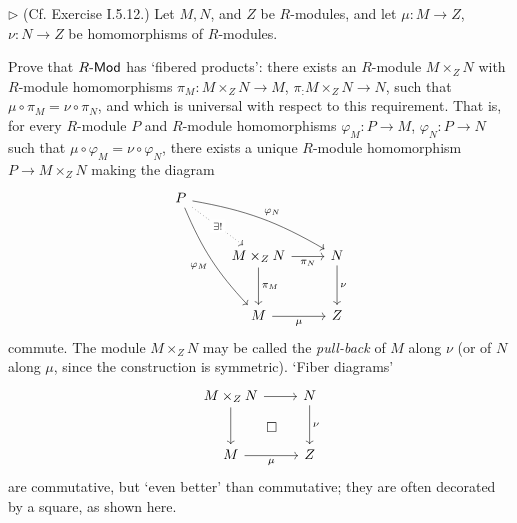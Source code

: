 \begin{problem}
	$\triangleright$ (Cf. Exercise I.5.12.) Let $M, N$, and $Z$ be $R$-modules, and let $\mu: M \to Z$, $\nu: N \to Z$ be homomorphisms of $R$-modules.
	
	Prove that $R\text{-}\mathsf{Mod}$ has `fibered products': there exists an $R$-module $M \times_Z N$ with $R$-module homomorphisms $\pi_M: M \times_Z N \to M$, $\pi_: M \times_Z N \to N$, such that $\mu \circ \pi_M = \nu \circ \pi_N$, and which is universal with respect to this requirement. That is, for every $R$-module $P$ and $R$-module homomorphisms $\varphi_M: P \to M$, $\varphi_N: P \to N$ such that $\mu \circ \varphi_M = \nu \circ \varphi_N$, there exists a unique $R$-module homomorphism $P \to M \times_Z N$ making the diagram
	\begin{equation*}
		\begin{tikzcd}[row sep=large]
			P
			\arrow[drr, bend left=10, "\varphi_N"]
			\arrow[dr, dotted, "\exists!" description]
			\arrow[ddr, bend right=10, "\varphi_M"']
			& & \\
			& M \times_Z N
			\arrow[r, "\pi_N"']
			\arrow[d, "\pi_M"]
			& N
			\arrow[d, "\nu"] \\
			& M
			\arrow[r, "\mu"']
			& Z
		\end{tikzcd}
	\end{equation*}
	commute. The module $M \times_Z N$ may be called the \emph{pull-back} of $M$ along $\nu$ (or of $N$ along $\mu$, since the construction is symmetric). `Fiber diagrams'
	\begin{equation*}
		\begin{tikzcd}[row sep=large]
			M \times_Z N
			\arrow[r]
			\arrow[d]
			\arrow[dr, phantom, "\square"]
			& N
			\arrow[d, "\nu"] \\
			M
			\arrow[r, "\mu"']
			& Z
		\end{tikzcd}
	\end{equation*}
	are commutative, but `even better' than commutative; they are often decorated by a square, as shown here.
\end{problem}

